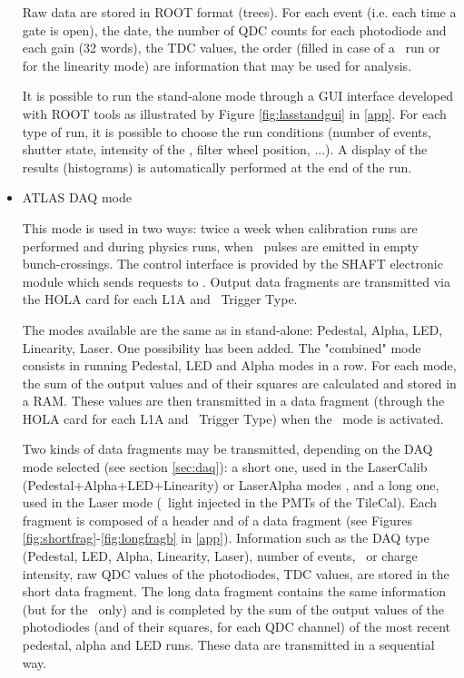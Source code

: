 \begin{itemize}
Raw data are stored in ROOT \cite{ref:root} format (trees). For each event (i.e. each time a gate is open), the date, the number of QDC counts for each photodiode and each gain (32 words), the TDC values, the order (filled in case of a \laser~run or for the linearity mode) are information that may be used for analysis. 

It is possible to run the stand-alone mode through a GUI interface developed with ROOT tools as illustrated by Figure \ref{fig:lasstandgui} in \ref{app}. For each type of run, it is possible to choose the run conditions (number of events, shutter state, intensity of the \laser, filter wheel position, ...). A display of the results (histograms) is automatically performed at the end of the run.

\item ATLAS DAQ mode

This mode is used in two ways: twice a week when calibration runs are performed and during physics runs, when \laser~pulses are emitted in empty bunch-crossings. The control interface is provided by the SHAFT electronic module which sends requests to \lascar. Output data fragments are transmitted via the HOLA card for each L1A and \laser~Trigger Type.

The modes available are the same as in stand-alone: Pedestal, Alpha, LED, Linearity, Laser. One possibility has been added. The "combined" mode consists in running Pedestal, LED and Alpha modes in a row. For each mode, the sum of the output values and of their squares are calculated and stored in a RAM. These values are then transmitted in a data fragment (through the HOLA card for each L1A and \laser~Trigger Type) when the \laser~mode is activated.

Two kinds of data fragments may be transmitted, depending on the DAQ mode selected (see section \ref{sec:daq}): a short one, used in the LaserCalib (Pedestal+Alpha+LED+Linearity) or LaserAlpha modes , and a long one, used in the Laser mode (\laser~light injected in the PMTs of the TileCal). Each fragment is composed of a header and of a data fragment (see Figures \ref{fig:shortfrag}-\ref{fig:longfragb} in \ref{app}). Information such as the DAQ type (Pedestal, LED, Alpha, Linearity, Laser), number of events, \laser~or charge intensity, raw QDC values of the photodiodes, TDC values, are stored in the short data fragment. The long data fragment contains the same information (but for the \laser~only) and is completed by the sum of the output values of the photodiodes (and of their squares, for each QDC channel) of the most recent pedestal, alpha and LED runs. These data are transmitted in a sequential way. 

\end{itemize}
